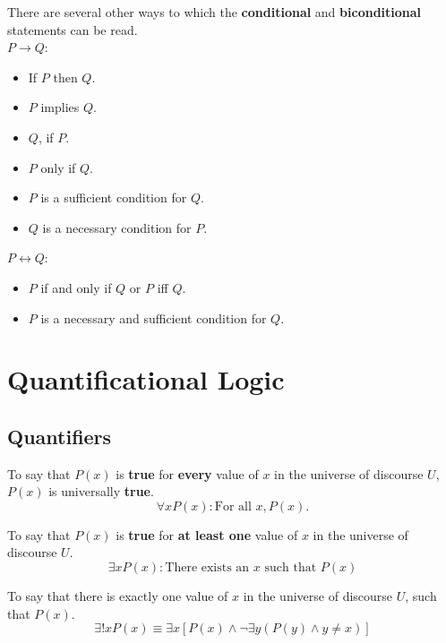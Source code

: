 \documentclass[../setup.tex]{subfiles}
\begin{document}
\begin{remark}
There are several other ways to which the \textbf{conditional} and \textbf{biconditional} statements can be read. \\
$P \rightarrow Q$:
\begin{itemize}
	\item If $P$ then $Q$.
	\item $P$ implies $Q$.
	\item $Q$, if $P$.
	\item $P$ only if $Q$.
	\item $P$ is a sufficient condition for $Q$.
	\item $Q$ is a necessary condition for $P$.
\end{itemize} 
$P \longleftrightarrow Q$:
\begin{itemize}
	\item $P$ if and only if $Q$ or $P$ iff $Q$.
	\item $P$ is a necessary and sufficient condition for $Q$.
\end{itemize}
\end{remark}



\section{Quantificational Logic}
\subsection{Quantifiers}
\begin{theorem}
To say that $P(x)$ is \textbf{true} for \textbf{every} value of $x$ in the universe of discourse $U$, $P(x)$ is universally \textbf{true}.
\[\forall xP(x): \text{For all } x, P(x).\]
\end{theorem}

\begin{theorem}
To say that $P(x)$ is \textbf{true} for \textbf{at least one} value of $x$ in the universe of discourse $U$.
\[\exists xP(x): \text{There exists an $x$ such that $P(x)$}\] 

To say that there is exactly one value of $x$ in the universe of discourse $U$, such that $P(x)$.
\[\exists !xP(x) \equiv \exists x\left[P(x)\land \lnot\exists y\left(P(y)\land y\neq x\right)\right]\]
\end{theorem}
\end{document}
